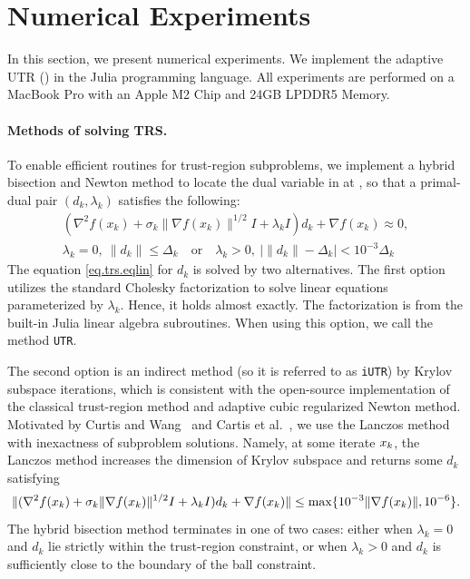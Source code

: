 \section{Numerical Experiments}\label{sec.num}
In this section, we present numerical experiments. We implement the adaptive UTR () in the Julia programming language. All experiments are performed on a MacBook Pro with an Apple M2 Chip and 24GB LPDDR5 Memory.

\paragraph{Methods of solving TRS.}
To enable efficient routines for trust-region subproblems, we implement a hybrid bisection and Newton method to locate the dual variable \citep{yeNewComplexityResult1991,yeCombiningBinarySearch1994} in  at , so that a primal-dual pair $(d_k, \lambda_k)$ satisfies the following:
\begin{align}
 \label{eq.trs.eqlin}   (\nabla^2f(x_k)+\sigma_k\|\nabla f(x_k)\|^{1/2} I+\lambda_kI)d_k + \nabla f(x_k) \approx 0, \\
    \lambda_k = 0, ~ \|d_k\| \le \Delta_k \quad \text{or} \quad 
    \lambda_k > 0, ~ |\|d_k\| - \Delta_k| < 10^{-3}\Delta_k
\end{align}
The equation \eqref{eq.trs.eqlin} for $d_k$ is solved by two alternatives.
The first option utilizes the standard Cholesky factorization \citep[Algorithm 4.3]{nocedal1999numerical} to solve linear equations parameterized by $\lambda_k$. Hence, it holds almost exactly.
The factorization is from the built-in Julia linear algebra subroutines.
When using this option, we call the method \texttt{UTR}. 

The second option is an indirect method (so it is referred to as \texttt{iUTR}) by Krylov subspace iterations, which is consistent with the open-source implementation \citep{dussault_scalable_2023} of the classical trust-region method and adaptive cubic regularized Newton method. Motivated by Curtis and Wang~\cite{curtisWorstCaseComplexityTRACE2023} and Cartis et al.~\cite[Chapter 10]{cartis2022evaluation}, we use the Lanczos method with inexactness of subproblem solutions. Namely, at some iterate $x_k$, the Lanczos method increases the dimension of Krylov subspace and returns some $d_k$ satisfying 
\begin{equation*}
    \|(\nabla^2f(x_k)+\sigma_k\|\nabla f(x_k)\|^{1/2} I+\lambda_k I)d_k + \nabla f(x_k)\| \le \max\{10^{-3}\|\nabla f(x_k)\|, 10^{-6}\}.
\end{equation*}
The hybrid bisection method terminates in one of two cases: either when $\lambda_k = 0$ and $d_k$ lie strictly within the trust-region constraint, or when $\lambda_k > 0$ and $d_k$ is sufficiently close to the boundary of the ball constraint.

